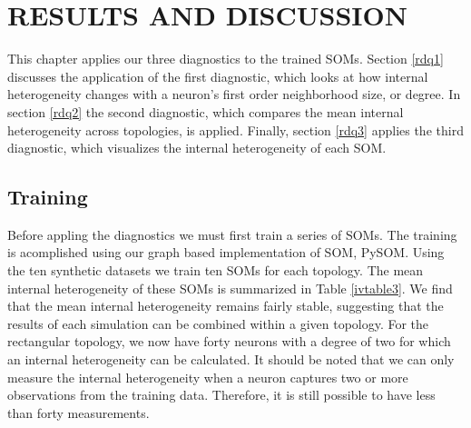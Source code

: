\chapter{RESULTS AND DISCUSSION}
This chapter applies our three diagnostics to the trained SOMs.  Section
\ref{rdq1} discusses the application of the first diagnostic, which looks at how internal heterogeneity
changes with a neuron's first order neighborhood size, or degree.  In section
\ref{rdq2} the second diagnostic, which compares the mean
internal heterogeneity across topologies, is applied.  Finally, section \ref{rdq3} applies the
third diagnostic, which visualizes the internal heterogeneity of each SOM.

\section{Training}
Before appling the diagnostics we must first train a series of SOMs.  The
training is acomplished using our graph based implementation of SOM, PySOM.
Using the ten synthetic datasets we train ten SOMs for each topology.  The
mean internal heterogeneity of these SOMs is summarized in Table
\ref{ivtable3}.  We find that the mean internal heterogeneity remains fairly
stable, suggesting that the results of each simulation can be combined within
a given topology.  For the rectangular topology, we now have forty neurons
with a degree of two for which an internal heterogeneity can be calculated. It
should be noted that we can only measure the internal heterogeneity when a
neuron captures two or more observations from the training data.  Therefore,
it is still possible to have less than forty measurements.

